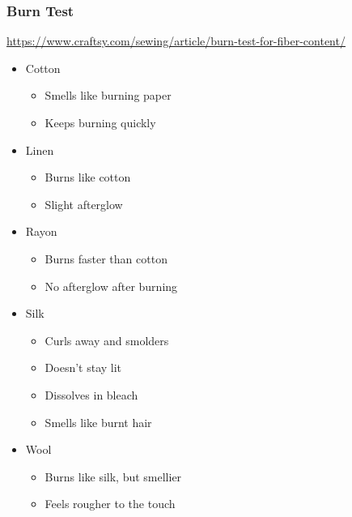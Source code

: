 \documentclass{beamer}
\begin{document}
\begin{frame}[fragile]
\frametitle{Burn Test}
\url{https://www.craftsy.com/sewing/article/burn-test-for-fiber-content/}
\begin{itemize}
\item Cotton
    \begin{itemize}
        \item Smells like burning paper
        \item Keeps burning quickly
    \end{itemize}
\item Linen
    \begin{itemize}
        \item Burns like cotton
        \item Slight afterglow
    \end{itemize}
\item Rayon
    \begin{itemize}
        \item Burns faster than cotton
        \item No afterglow after burning
    \end{itemize}
\item Silk
    \begin{itemize}
        \item Curls away and smolders
        \item Doesn't stay lit
        \item Dissolves in bleach
        \item Smells like burnt hair
    \end{itemize}
\item Wool
    \begin{itemize}
        \item Burns like silk, but smellier
        \item Feels rougher to the touch
    \end{itemize}
\end{itemize}
\end{frame}
\end{document}
